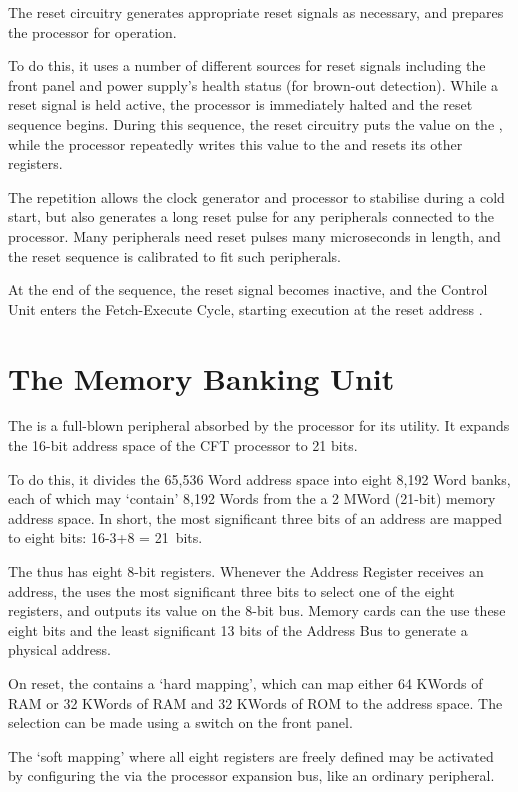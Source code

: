 The reset circuitry generates appropriate reset signals as necessary,
and prepares the processor for operation.

To do this, it uses a number of different sources for reset signals
including the front panel and power supply's health status (for
brown-out detection). While a reset signal is held active, the
processor is immediately halted and the reset sequence begins. During
this sequence, the reset circuitry puts the value  on the
\IBUS{}, while the processor repeatedly writes this value to the \PC{}
and resets its other registers.

The repetition allows the clock generator and processor to stabilise
during a cold start, but also generates a long reset pulse for any
peripherals connected to the processor. Many peripherals need reset
pulses many microseconds in length, and the reset sequence is
calibrated to fit such peripherals.

At the end of the sequence, the reset signal becomes inactive, and the
Control Unit enters the Fetch-Execute Cycle, starting execution at the
reset address .

\section{The Memory Banking Unit}

The \MBU{} is a full-blown peripheral absorbed by the processor for
its utility. It expands the 16-bit address space of the CFT processor
to 21 bits.

To do this, it divides the 65,536 Word address space into eight 8,192
Word banks, each of which may ‘contain’ 8,192 Words from the a 2 MWord
(21-bit) memory address space. In short, the most significant three
bits of an address are mapped to eight bits: 16-3+8 = 21~bits.

The \MBU{} thus has eight 8-bit registers. Whenever the Address
Register receives an address, the \MBU{} uses the most significant
three bits to select one of the eight registers, and outputs its value
on the 8-bit \AEXT{} bus. Memory cards can the use these eight bits
and the least significant 13 bits of the Address Bus to generate a
physical address.

On reset, the \MBU{} contains a ‘hard mapping’, which can map either
64 KWords of RAM or 32 KWords of RAM and 32 KWords of ROM to the
address space. The selection can be made using a switch on the front
panel.

The ‘soft mapping’ where all eight registers are freely defined may be
activated by configuring the \MBU{} via the processor expansion bus,
like an ordinary peripheral.

